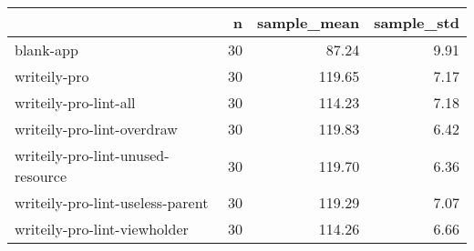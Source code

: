 \begin{tabular}{lrrr}
\toprule
{} &   n &  sample\_mean &  sample\_std \\
\midrule
blank-app                         &  30 &        87.24 &        9.91 \\
writeily-pro                      &  30 &       119.65 &        7.17 \\
writeily-pro-lint-all             &  30 &       114.23 &        7.18 \\
writeily-pro-lint-overdraw        &  30 &       119.83 &        6.42 \\
writeily-pro-lint-unused-resource &  30 &       119.70 &        6.36 \\
writeily-pro-lint-useless-parent  &  30 &       119.29 &        7.07 \\
writeily-pro-lint-viewholder      &  30 &       114.26 &        6.66 \\
\bottomrule
\end{tabular}
